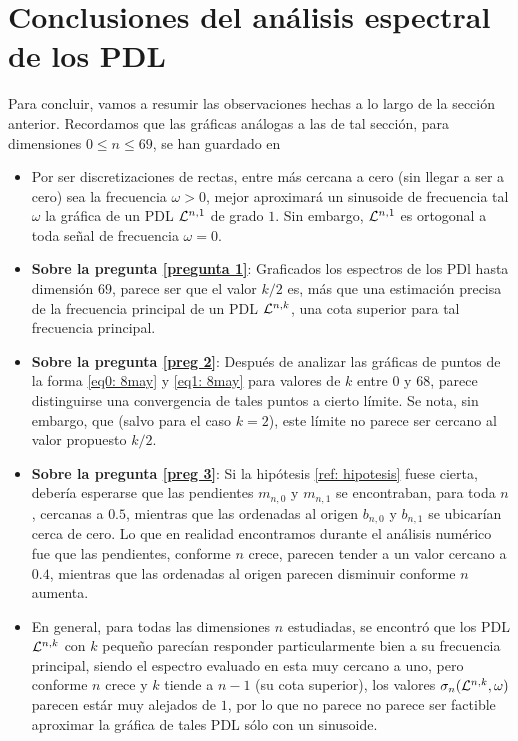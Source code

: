 \section{Conclusiones del análisis espectral de los PDL}
Para concluir,
vamos a resumir las observaciones hechas a lo largo 
de la sección anterior.
Recordamos que las gráficas análogas a las de tal sección,
para dimensiones $0 \leq n \leq 69$, se han guardado 
en 

\begin{itemize}
\item Por ser discretizaciones de rectas,
entre más cercana a cero (sin llegar
a ser a cero) sea la frecuencia
$\omega >0$, mejor aproximará un sinusoide 
de frecuencia tal $\omega$ la gráfica de un
PDL $\mathcal{L}^{n,1}$ de grado $1$. Sin embargo,
$\mathcal{L}^{n,1}$ es ortogonal a toda señal de frecuencia
$\omega = 0$.

\item \textbf{Sobre la pregunta \ref{pregunta 1}}:
Graficados los espectros de los PDl hasta dimensión $69$, parece
ser que el valor $k/2$ es, más que una estimación precisa
de la frecuencia principal de un PDL $\mathcal{L}^{n,k}$, una cota
superior para tal frecuencia principal.

\item \textbf{Sobre la pregunta \ref{preg 2}}: 
Después de analizar las gráficas 
de puntos de la forma 
\eqref{eq0: 8may} y \eqref{eq1: 8may}
para valores de $k$ entre $0$ y $68$, parece distinguirse
una convergencia de tales puntos a cierto límite.
Se nota, sin embargo, que (salvo para el caso
$k = 2$), este límite no parece ser cercano
al valor propuesto $k/2$.

\item \textbf{Sobre la pregunta \ref{preg 3}}:
Si la hipótesis \ref{ref: hipotesis} fuese cierta, debería
esperarse que las pendientes
$m_{n,0}$ y $m_{n,1}$ se encontraban, para toda $n$,
cercanas a $0.5$, mientras que las ordenadas al origen
$b_{n,0}$ y $b_{n,1}$ se ubicarían cerca de cero. Lo que en realidad
encontramos durante el análisis numérico fue que
las pendientes, conforme $n$ crece, parecen tender a un 
valor cercano a 
$0.4$, mientras que las ordenadas al origen parecen
disminuir conforme $n$ aumenta. 


\item 
En general, para todas las dimensiones $n$ estudiadas,
se encontró que los PDL $\mathcal{L}^{n,k}$ con $k$
pequeño parecían responder particularmente bien
a su frecuencia principal, siendo el espectro
evaluado en esta muy cercano a uno, pero conforme
$n$ crece y 
$k$ tiende a $n-1$ (su cota superior),
los valores $\sigma_{n}(\mathcal{L}^{n,k}, \omega)$
parecen estár muy alejados de $1$, por lo que no parece
no parece ser factible aproximar la gráfica
de tales PDL sólo con un sinusoide.
\end{itemize}